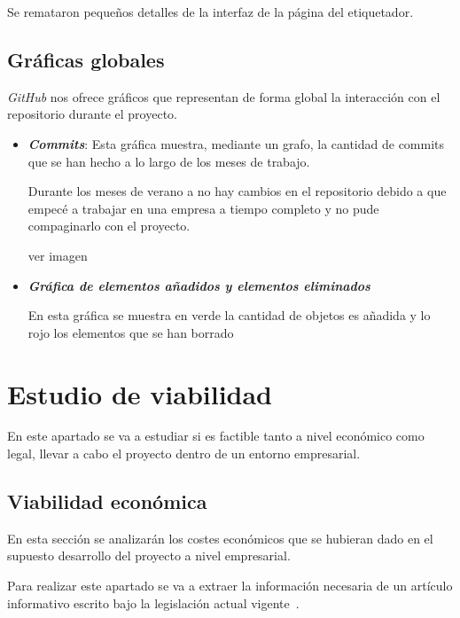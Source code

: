 Se remataron pequeños detalles de la interfaz de la página del etiquetador.



\subsection{Gráficas globales}

\textit{GitHub} nos ofrece gráficos que representan de forma global la interacción con el repositorio durante el proyecto. 

\begin{itemize}
	\item \textit{\textbf{Commits}}: Esta gráfica muestra, mediante un grafo, la cantidad de commits que se han hecho a lo largo de los meses de trabajo.
	
	Durante los meses de verano a no hay cambios en el repositorio debido a que empecé a trabajar en una empresa a tiempo completo y no pude compaginarlo con el proyecto. 
	
	ver imagen \label{fig: grafo} 
	
	
	\item \textit{\textbf{Gráfica de elementos añadidos y elementos eliminados}}
	
	En esta gráfica se muestra en verde la cantidad de objetos es añadida y lo rojo los elementos que se han borrado
	


	
\end{itemize}
\section{Estudio de viabilidad}
En este apartado se va a estudiar si es factible tanto a nivel económico como legal, llevar a cabo el proyecto dentro de un entorno empresarial.

\subsection{Viabilidad económica}
En esta sección se analizarán los costes económicos que se hubieran dado en el supuesto desarrollo del proyecto a nivel empresarial.

Para realizar este apartado se va a extraer la información necesaria de un artículo informativo escrito bajo la legislación actual vigente~\cite{cotizacion}.

